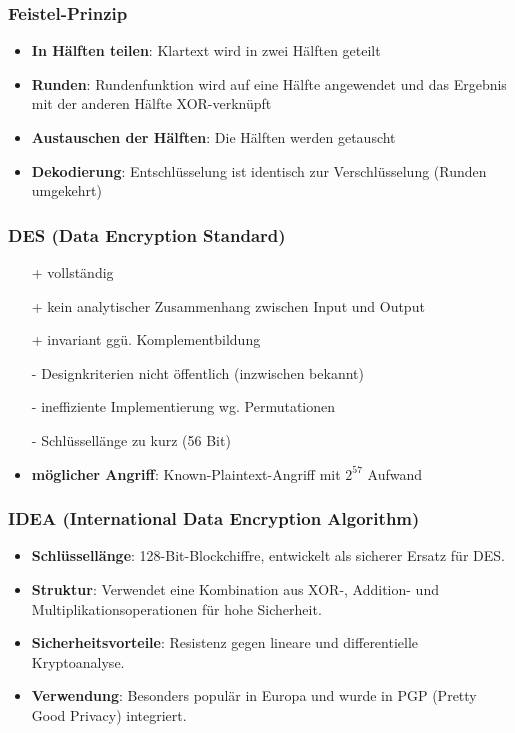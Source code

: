 \documentclass{article}
\begin{document}
\subsubsection{Feistel-Prinzip}
\begin{itemize}
  \item \textbf{In Hälften teilen}: Klartext wird in zwei Hälften geteilt
  \item \textbf{Runden}: Rundenfunktion wird auf eine Hälfte angewendet und das Ergebnis mit der anderen Hälfte XOR-verknüpft
  \item \textbf{Austauschen der Hälften}: Die Hälften werden getauscht
  \item \textbf{Dekodierung}: Entschlüsselung ist identisch zur Verschlüsselung (Runden umgekehrt)
\end{itemize}

\subsubsection{DES (Data Encryption Standard)}
\begin{itemize}
  \item[+] vollständig
  \item[+] kein analytischer Zusammenhang zwischen Input und Output
  \item[+] invariant ggü. Komplementbildung
  \item[-] Designkriterien nicht öffentlich (inzwischen bekannt)
  \item[-] ineffiziente Implementierung wg. Permutationen
  \item[-] Schlüssellänge zu kurz (56 Bit)
  \item \textbf{möglicher Angriff}: Known-Plaintext-Angriff mit $2^{57}$ Aufwand
\end{itemize}

\subsubsection{IDEA (International Data Encryption Algorithm)}
\begin{itemize}
  \item \textbf{Schlüssellänge}: 128-Bit-Blockchiffre, entwickelt als sicherer Ersatz für DES.
  \item \textbf{Struktur}: Verwendet eine Kombination aus XOR-, Addition- und Multiplikationsoperationen für hohe Sicherheit.
  \item \textbf{Sicherheitsvorteile}: Resistenz gegen lineare und differentielle Kryptoanalyse.
  \item \textbf{Verwendung}: Besonders populär in Europa und wurde in PGP (Pretty Good Privacy) integriert.
\end{itemize}
\end{document}
